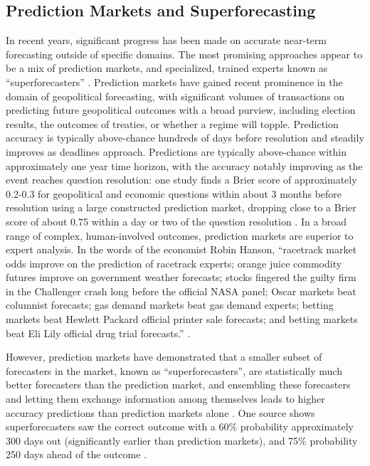 \documentclass[12pt,a4paper]{article}
\begin{document}
\subsection{Prediction Markets and Superforecasting}
In recent years, significant progress has been made on accurate near-term forecasting outside of specific domains. The most promising approaches appear to be a mix of prediction markets, and specialized, trained experts known as ``superforecasters'' . Prediction markets have gained recent prominence in the domain of geopolitical forecasting, with significant volumes of transactions on predicting future geopolitical outcomes with a broad purview, including election results, the outcomes of treaties, or whether a regime will topple. Prediction accuracy is typically above-chance hundreds of days before resolution and steadily improves as deadlines approach. Predictions are typically above-chance within approximately one year time horizon, with the accuracy notably improving as the event reaches question resolution: one study finds a Brier score of approximately 0.2-0.3 for geopolitical and economic questions within about 3 months before resolution using a large constructed prediction market, dropping close to a Brier score of about 0.75 within a day or two of the question resolution .  In a broad range of complex, human-involved outcomes, prediction markets are superior to expert analysis. In the words of the economist Robin Hanson, ``racetrack market odds improve on the prediction of racetrack  experts; orange juice commodity futures improve on government weather forecasts;  stocks fingered the guilty firm in the Challenger crash long before the official NASA  panel; Oscar markets beat columnist forecasts; gas demand markets beat gas  demand experts; betting markets beat Hewlett Packard official printer sale  forecasts; and betting markets beat Eli Lily official drug trial forecasts.''  . 

However, prediction markets have demonstrated that a smaller subset of forecasters in the market, known as ``superforecasters'', are statistically much better forecasters than the prediction market, and ensembling these forecasters and letting them exchange information among themselves leads to higher accuracy predictions than prediction markets alone . One source shows superforecasters saw the correct outcome with a 60\% probability approximately 300 days out (significantly earlier than prediction markets), and 75\% probability 250 days ahead of the outcome .
\end{document}
